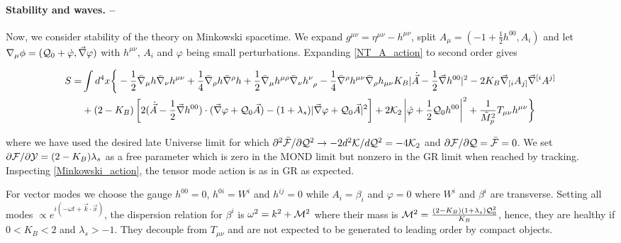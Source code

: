 \documentclass[twocolumn,prl,preprintnumbers,amsmath,amssymb,nofootinbib]{revtex4-2}
\newcommand{\mass}{\ensuremath{{\cal M}}}
\newcommand{\nablab}{\bar{\nabla}}
\newcommand{\grad}{\ensuremath{\vec{\nabla}}}
\newcommand{\lambdas}{\lambda_s}
\newcommand{\Kcal}{{\cal K}}
\newcommand{\Ah}{{A}}
\newcommand{\Mpt}{\tilde{M}_p}
\newcommand{\Mcal}{{\cal M}}
\newcommand{\Fcal}{{\cal F}}
\newcommand{\Qcal}{{\cal Q}}
\newcommand{\Ycal}{{\cal Y}}
\newcommand{\KB}{\ensuremath{K_{B}}}
\begin{document}
\paragraph{Stability and waves. --}
Now, we consider stability of the theory on Minkowski spacetime.
We expand $g^{\mu\nu} = \eta^{\mu\nu} - h^{\mu\nu}$, split $\Ah_\mu =(-1+\frac{1}{2} h^{00}, \Ah_i)$ %
 and let $\nabla_\mu\phi =  (\Qcal_0 + \dot{\varphi} , \grad\varphi)$ with $h^{\mu\nu}$, $\Ah_i$ and $\varphi$ being small perturbations.
Expanding  \eqref{NT_A_action} to second order gives 
\begin{widetext}
\begin{align}
S =&  \int d^4x  \bigg\{ 
 - \frac{1}{2} \nablab_\mu h \nablab_\nu h^{\mu\nu}
+ \frac{1}{4}  \nablab_\rho h \nablab^\rho h
+ \frac{1}{2} \nablab_{\mu} h^{\mu\rho}  \nablab_\nu h^\nu_{\;\;\rho}
- \frac{1}{4} \nablab^\rho h^{\mu\nu}  \nablab_\rho  h_{\mu\nu}
  \KB |\dot{\vec{\Ah}} - \frac{1}{2} \grad h^{00}|^2
- 2\KB \grad_{[i} \Ah_{j]} \grad^{[i} \Ah^{j]}
\nonumber
\\
&
+  \left(2 - \KB\right)\left[  2(  \dot{\vec{\Ah}}  -  \frac{1}{2}  \grad h^{00} ) \cdot ( \grad \varphi + \Qcal_0 \vec{\Ah} ) 
- ( 1 + \lambdas )  |\grad\varphi + \Qcal_0 \vec{\Ah}|^2
\right]
+2 \Kcal_2  \left|\dot{\varphi} +  \frac{1}{2}\Qcal_0 h^{00} \right|^2
+  \frac{1}{\Mpt^2} T_{\mu\nu} h^{\mu\nu}
 \bigg\}
\label{Minkowski_action}
\end{align}
\end{widetext}
where we have used the desired late Universe limit for which $\partial^2\bar{\Fcal}/\partial\Qcal^2 \rightarrow -2 d^2\Kcal/d\Qcal^2 = - 4 \Kcal_2 $
and $\partial\Fcal/\partial\Qcal =  \bar{\Fcal} = 0$.  We set $\partial\Fcal/\partial\Ycal  = (2-\KB)\lambdas$ as a free parameter which is
zero in the MOND limit  but nonzero in the GR limit when reached by tracking.  Inspecting \eqref{Minkowski_action}, the tensor mode action is as in GR as expected. 

For vector modes we choose the gauge $h^{00}=0$,  $h^{0i} =W^i$ and  $h^{ij} =0$  while $\Ah_i = \beta_i$ and $\varphi=0$
where $W^i$ and $\beta^i$ are transverse. Setting all modes $\propto e^{i(-\omega t + \vec{k}\cdot\vec{x})}$, 
the dispersion relation for $\beta^i$ is $\omega^2 = k^2 + \Mcal^2$
where their  mass is $ \mass^2 = \frac{(2-\KB)(1 + \lambdas )  \Qcal_0^2}{\KB}$, hence, they  are healthy if $0<\KB<2$ and $\lambdas>-1$.
They decouple from $T_{\mu\nu}$ and are not expected
to be generated to leading order by compact objects.
\end{document}
